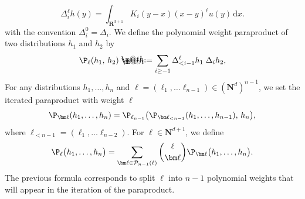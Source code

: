 \documentclass[11pt]{preprint}
\makeatletter
\newcommand{\mcP}{\mathcal{P}}
\newcommand*{\defeq}{\mathrel{\rlap{%
			\raisebox{0.3ex}{$\m@th\cdot$}}%
		\raisebox{-0.3ex}{$\m@th\cdot$}}%
	=}
\newcommand{\bfN}{\mathbf{N}}
\newcommand{\bfR}{\mathbf{R}}
\newcommand{\ddd}{ \text{d} }
\makeatother
\begin{document}
	\begin{equation}\label{eqdef_littlewoodprojectorL}
		\Delta_i^\ell h (y)= \int_{\bfR^{d+1}} K_i(y-x)(x-y)^\ell u(y)\, \ddd x.
	\end{equation}
	with the convention $   \Delta_i^{0} = \Delta_i $. 
	We define the polynomial weight paraproduct of two distributions $h_1$ and $h_2$ by 
	$$
	\P_{{ \ell}}(h_1,\, h_2) \defeq \sum_{i\geq -1} \Delta^{\ell}_{<i-1} h_1 \; \Delta_i h_2,
	$$
	For any distributions $h_1,\dots,h_n$ and ${ \bm \ell }=(\ell_1,\dots \ell_{n-1})\in (\bfN^{d})^{n-1}$, we set the iterated paraproduct with weight ${\bm \ell}$ 
	$$
	\P_{{\bm \ell}}(h_1,\dots,h_n) =  \P_{\ell_{n-1}}\big( \P_{{\bm \ell}_{<n-1}}(h_1,\dots,h_{n-1}), \, h_n\big),
	$$
	where $ {\bm \ell}_{< n-1} = (\ell_1,\dots \ell_{n-2}) $.
	For $\ell\in\bfN^{d+1}$, we define
	\begin{equation}\label{eqdef_ParapPolWeight2}
		\P_{\ell}\big(h_1,\dots,h_n\big) = \sum_{{\bm \ell}\in \mcP_{n-1}(\ell)} \binom{\ell}{\bm \ell}  \P_{\bm \ell}\big(h_1,\dots,h_n\big).
	\end{equation}
The previous formula corresponds to split $\ell $ into $ n-1 $ polynomial weights that will appear in the iteration of the paraproduct.
	
	
	
	
	
	
	
	
	
	

	

	

	
\end{document}
